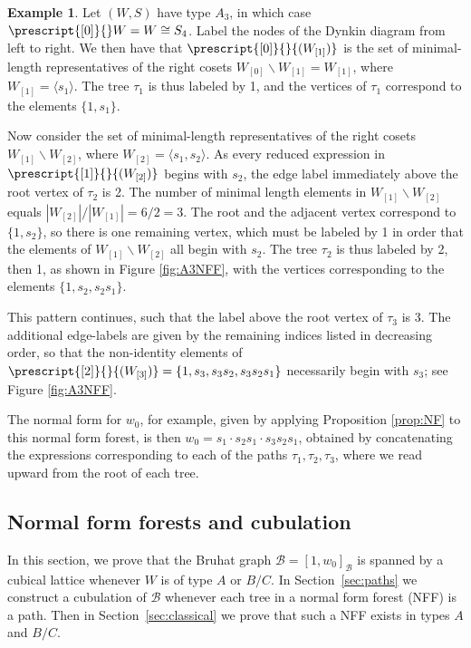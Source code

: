 \documentclass[11pt]{amsart}
\theoremstyle{plain}
\theoremstyle{definition}
\newtheorem{example}[thm]{Example}
\newcommand{\cB}{\mathcal B}
\numberwithin{equation}{subsection}
\begin{document}
\begin{example}\label{ex:A3NFF}
Let $(W,S)$ have type $A_3$, in which case $\prescript{[0]}{}W = W \cong S_4$.  Label the nodes of the Dynkin diagram from left to right. We then have that $\prescript{[0]}{}{(W_{[1]})}$ is the set of minimal-length representatives of the right cosets $W_{[0]}\backslash W_{[1]} = W_{[1]}$, where $W_{[1]} = \langle s_1 \rangle$. The tree $\tau_1$ is thus labeled by 1, and the vertices of $\tau_1$ correspond to the elements $\{1, s_1\}$.

Now consider the set of minimal-length representatives of the right cosets $W_{[1]} \backslash W_{[2]}$, where $W_{[2]} = \langle s_1, s_2 \rangle$. As every reduced expression in $\prescript{[1]}{}{(W_{[2]})}$ begins with $s_2$, the edge label immediately above the root vertex of $\tau_2$ is 2.  The number of minimal length elements in $W_{[1]} \backslash W_{[2]}$ equals $|W_{[2]}| / |W_{[1]}| = 6/2 = 3$. The root and the adjacent vertex correspond to $\{1,s_2\}$, so there is one remaining vertex, which must be labeled by 1 in order that the elements of $W_{[1]} \backslash W_{[2]}$ all begin with $s_2$.  The tree $\tau_2$ is thus labeled by 2, then 1, as shown in Figure \ref{fig:A3NFF}, with the vertices corresponding to the elements $\{1, s_2, s_2s_1\}$.

This pattern continues, such that the label above the root vertex of $\tau_3$ is 3. The additional edge-labels are given by the remaining indices listed in decreasing order, so that the non-identity elements of $\prescript{[2]}{}{(W_{[3]})} = \{1, s_3, s_3s_2, s_3s_2s_1\}$ necessarily begin with $s_3$; see Figure \ref{fig:A3NFF}.

The normal form for $w_0$, for example, given by applying Proposition \ref{prop:NF} to this normal form forest, is then $w_0 = s_1 \cdot s_2s_1 \cdot s_3s_2s_1$, obtained by concatenating the expressions corresponding to each of the paths $\tau_1, \tau_2, \tau_3$, where we read upward from the root of each tree.
\end{example}

\subsection{Normal form forests and cubulation}\label{sec:NFF_cubulation}

In this section, we prove that the Bruhat graph $\cB = [1,w_0]_\cB$ is spanned by a cubical lattice whenever $W$ is of type $A$ or $B/C$. In Section~\ref{sec:paths} we construct a cubulation of $\cB$ whenever each tree in a normal form forest (NFF) is a path. Then in Section~\ref{sec:classical} we prove that such a NFF exists in types $A$ and $B/C$.
\end{document}
